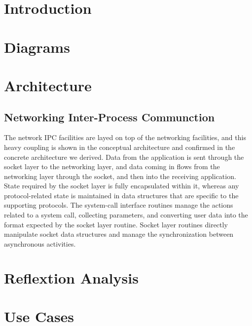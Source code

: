\documentclass[12pt, dvipsnames, a4paper]{article}
\begin{document}
\section{Introduction}
\lipsum[1]

\section{Diagrams}
\lipsum[1]

\section{Architecture}
\subsection{Networking Inter-Process Communction}
The network IPC facilities are layed on top of the networking facilities, and this heavy coupling is shown in the conceptual architecture and confirmed in the concrete architecture we derived. Data from the application is sent through the socket layer to the networking layer, and data coming in flows from the networking layer through the socket, and then into the receiving application.  State required by the socket layer is fully encapsulated within it, whereas any protocol-related state is maintained in data structures that are specific to the supporting protocols. The system-call interface routines manage the actions related to a system call, collecting parameters, and converting user data into the format expected by the socket layer routine. Socket layer routines directly manipulate socket data structures and manage the synchronization between asynchronous activities.

\section{Reflextion Analysis}

\clearpage
\section{Use Cases}
\end{document}
